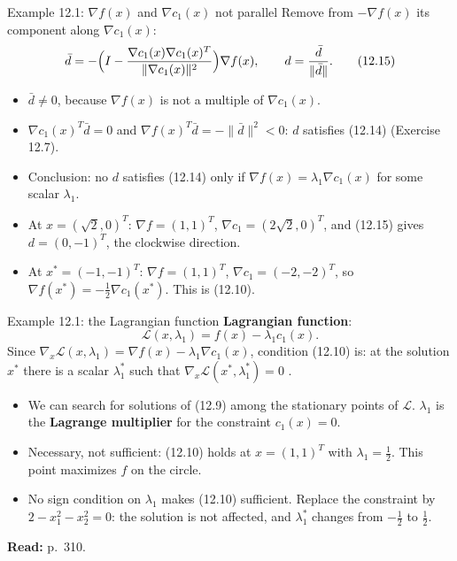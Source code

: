 \documentclass[aspectratio=169,12pt]{beamer}
\newcommand{\xs}{x^{*}}
\newcommand{\gradf}{\nabla f}
\newcommand{\eqn}[1]{\text{\small(#1)}}
\newcommand{\readbook}[1]{{\color{red}\textbf{Read:} #1}}
\newcommand{\ls}{\lambda^{*}}
\newcommand{\cL}{\mathcal{L}}
\begin{document}
\begin{frame}{Example 12.1: $\gradf(x)$ and $\nabla c_{1}(x)$ not parallel}
  Remove from $-\gradf(x)$ its component along $\nabla c_{1}(x)$:
  \[ \bar d=-\Bigl(I-\frac{\nabla c_{1}(x)\nabla c_{1}(x)^{T}}{\|\nabla c_{1}(x)\|^{2}}\Bigr)\gradf(x),
     \qquad d=\frac{\bar d}{\|\bar d\|} . \tag{12.15} \]
  \begin{itemize}\setlength\itemsep{0.35em}
    \item $\bar d\ne 0$, because $\gradf(x)$ is not a multiple of $\nabla c_{1}(x)$.
    \item $\nabla c_{1}(x)^{T}\bar d=0$ and $\gradf(x)^{T}\bar d=-\|\bar d\|^{2}<0$:
      $d$ satisfies (12.14) (Exercise 12.7).
    \item Conclusion: no $d$ satisfies (12.14) only if $\gradf(x)=\lambda_{1}\nabla c_{1}(x)$
      for some scalar $\lambda_{1}$.
    \item At $x=(\sqrt2,0)^{T}$: $\gradf=(1,1)^{T}$, $\nabla c_{1}=(2\sqrt2,0)^{T}$, and (12.15) gives
      $d=(0,-1)^{T}$, the clockwise direction.
    \item At $\xs=(-1,-1)^{T}$: $\gradf=(1,1)^{T}$, $\nabla c_{1}=(-2,-2)^{T}$, so
      $\gradf(\xs)=-\tfrac12\nabla c_{1}(\xs)$. This is (12.10).
  \end{itemize}
\end{frame}

\begin{frame}{Example 12.1: the Lagrangian function}
  \textbf{Lagrangian function}:
  \[ \cL(x,\lambda_{1})=f(x)-\lambda_{1}c_{1}(x) . \tag{12.16} \]
  Since $\nabla_{x}\cL(x,\lambda_{1})=\gradf(x)-\lambda_{1}\nabla c_{1}(x)$, condition (12.10) is:
  at the solution $\xs$ there is a scalar $\ls_{1}$ such that
  $\nabla_{x}\cL(\xs,\ls_{1})=0$ \eqn{12.17}.
  \begin{itemize}\setlength\itemsep{0.4em}
    \item We can search for solutions of (12.9) among the stationary points of $\cL$.
      $\lambda_{1}$ is the \textbf{Lagrange multiplier} for the constraint $c_{1}(x)=0$.
    \item Necessary, not sufficient: (12.10) holds at $x=(1,1)^{T}$ with $\lambda_{1}=\tfrac12$.
      This point maximizes $f$ on the circle.
    \item No sign condition on $\lambda_{1}$ makes (12.10) sufficient. Replace the constraint by
      $2-x_{1}^{2}-x_{2}^{2}=0$: the solution is not affected, and $\ls_{1}$ changes from
      $-\tfrac12$ to $\tfrac12$.
  \end{itemize}
  \readbook{p.~310.}
\end{frame}
\end{document}
